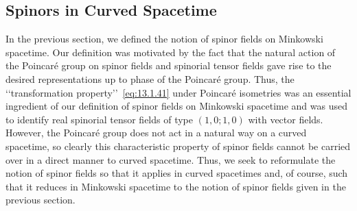 
\subsection{Spinors in Curved Spacetime}\label{sec:13.2}

In the previous section, we defined the notion of spinor fields on Minkowski
spacetime. Our definition was motivated by the fact that the natural action of the
Poincar\'e group on spinor fields and spinorial tensor fields gave rise to the desired
representations up to phase of the Poincar\'e group. Thus, the
\lq\lq transformation property\rq\rq\ \eqref{eq:13.1.41} under Poincar\'e
isometries was an essential ingredient of our definition of spinor fields on
Minkowski spacetime and was used to identify real spinorial tensor fields of type
\((1,0;1,0)\) with vector fields. However, the Poincar\'e group does not act in a
natural way on a curved spacetime, so clearly this characteristic property of spinor
fields cannot be carried over in a direct manner to curved spacetime. Thus, we seek
to reformulate the notion of spinor fields so that it applies in curved spacetimes
and, of course, such that it reduces in Minkowski spacetime to the notion of spinor
fields given in the previous section.

